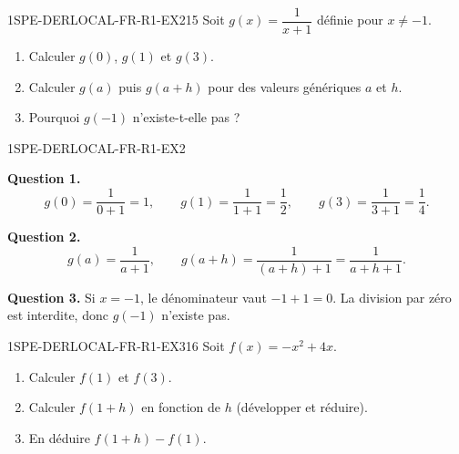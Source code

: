 
\begin{exercice}{1SPE-DERLOCAL-FR-R1-EX2}{1}{5}
Soit $g(x) = \dfrac{1}{x+1}$ définie pour $x
\neq -1$.
\begin{enumerate}
  \item Calculer $g(0)$, $g(1)$ et $g(3)$.
  \item Calculer $g(a)$ puis $g(a+h)$ pour des valeurs génériques $a$ et $h$.
  \item Pourquoi $g(-1)$ n'existe-t-elle pas ?
\end{enumerate}
\end{exercice}


\begin{corrige}{1SPE-DERLOCAL-FR-R1-EX2}

\textbf{Question 1.}
\[
g(0) = \frac{1}{0+1} = 1, \qquad
g(1) = \frac{1}{1+1} = \frac{1}{2}, \qquad
g(3) = \frac{1}{3+1} = \frac{1}{4}.
\]


\textbf{Question 2.}
\[
g(a) = \frac{1}{a+1}, \qquad
g(a+h) = \frac{1}{(a+h)+1} = \frac{1}{a+h+1}.
\]

\textbf{Question 3.} Si $x = -1$, le dénominateur vaut $-1+1 = 0$. La division par zéro est interdite, donc $g(-1)$ n'existe pas.

\end{corrige}


\begin{exercice}{1SPE-DERLOCAL-FR-R1-EX3}{1}{6}
Soit $f(x) = -x^2 + 4x$.
\begin{enumerate}
  \item Calculer $f(1)$ et $f(3)$.
  \item Calculer $f(1+h)$ en fonction de $h$ (développer et réduire).
  \item En déduire $f(1+h) - f(1)$.
\end{enumerate}
\end{exercice}


